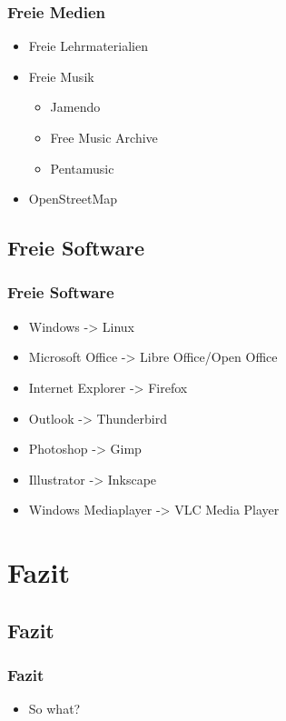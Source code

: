 \documentclass{beamer}
\begin{document}
\begin{frame}
  \frametitle{Freie Medien}
  \begin{itemize}
    \item<1-> Freie Lehrmaterialien
    \item<2-> Freie Musik
      \begin{itemize}
        \item Jamendo
        \item Free Music Archive
        \item Pentamusic
      \end{itemize}
    \item<3-> OpenStreetMap
  \end{itemize}
\end{frame}

\subsection{Freie Software}

\begin{frame}
  \frametitle{Freie Software}
  \begin{itemize}
    \item Windows -> Linux
    \item Microsoft Office -> Libre Office/Open Office
    \item Internet Explorer -> Firefox
    \item Outlook -> Thunderbird
    \item Photoshop -> Gimp
    \item Illustrator -> Inkscape
    \item Windows Mediaplayer -> VLC Media Player
  \end{itemize}
\end{frame}

\section{Fazit}

\subsection{Fazit}

\begin{frame}
  \frametitle{Fazit}
  \begin{itemize}
    \item So what?
  \end{itemize}
\end{frame}
\end{document}
